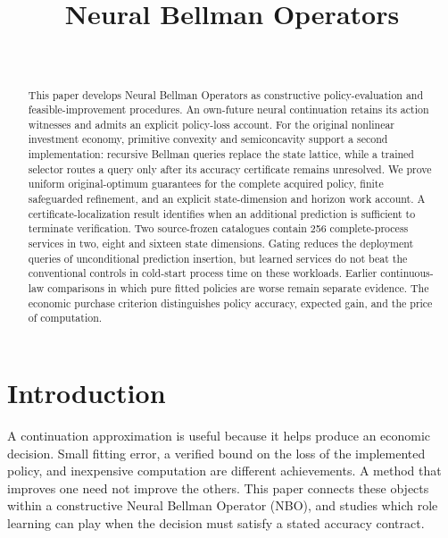 \documentclass[ecta,nameyear,draft]{econsocart}
\begin{document}
\begin{frontmatter}
\title{Neural Bellman Operators}
\begin{aug}
\author[id=au1,addressref={add1}]{~}
\address[id=add1]{Peking University}
\end{aug}
\begin{abstract}
This paper develops Neural Bellman Operators as constructive policy-evaluation and feasible-improvement procedures. An own-future neural continuation retains its action witnesses and admits an explicit policy-loss account. For the original nonlinear investment economy, primitive convexity and semiconcavity support a second implementation: recursive Bellman queries replace the state lattice, while a trained selector routes a query only after its accuracy certificate remains unresolved. We prove uniform original-optimum guarantees for the complete acquired policy, finite safeguarded refinement, and an explicit state-dimension and horizon work account. A certificate-localization result identifies when an additional prediction is sufficient to terminate verification. Two source-frozen catalogues contain 256 complete-process services in two, eight and sixteen state dimensions. Gating reduces the deployment queries of unconditional prediction insertion, but learned services do not beat the conventional controls in cold-start process time on these workloads. Earlier continuous-law comparisons in which pure fitted policies are worse remain separate evidence. The economic purchase criterion distinguishes policy accuracy, expected gain, and the price of computation.
\end{abstract}
\begin{keyword}
\end{keyword}
\end{frontmatter}
\section{Introduction}\label{sec:introduction65}
A continuation approximation is useful because it helps produce an economic decision. Small fitting error, a verified bound on the loss of the implemented policy, and inexpensive computation are different achievements. A method that improves one need not improve the others. This paper connects these objects within a constructive Neural Bellman Operator (NBO), and studies which role learning can play when the decision must satisfy a stated accuracy contract.
\end{document}
